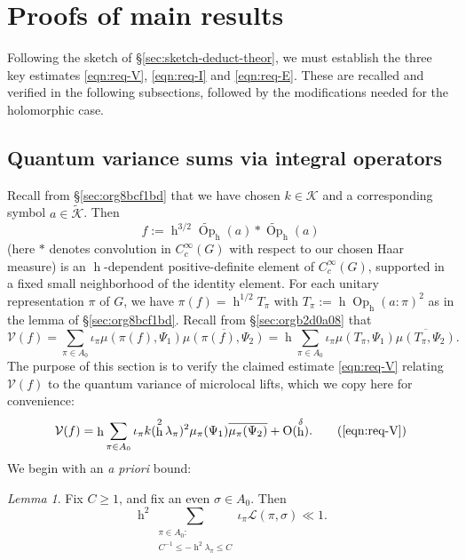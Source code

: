 \documentclass[reqno,10pt]{amsart}
\theoremstyle{plain} %
\theoremstyle{definition}
\theoremstyle{plain} %
\theoremstyle{remark}
\theoremstyle{itplain} %
\newtheorem*{lemma*}{Lemma}
\theoremstyle{remark} %
\renewcommand{\geq}{\geqslant}
\renewcommand{\leq}{\leqslant}
\numberwithin{equation}{section}
\def\O{\operatorname{O}}
\DeclareMathOperator{\Opp}{Op}
\DeclareMathOperator{\h}{h}
\begin{document}
    







\section{Proofs of main results}\label{sec:35ac3e57a1}
Following the sketch of \S\ref{sec:sketch-deduct-theor}, we must establish the three key estimates \eqref{eqn:req-V}, \eqref{eqn:req-I} and \eqref{eqn:req-E}.  These are recalled and verified in the following subsections, followed by the modifications needed for the holomorphic case.

\subsection{Quantum variance
  sums via integral operators}\label{sec:defn-f}
Recall from \S\ref{sec:org8bcf1bd} that we have chosen $k \in \mathcal{K}$ and a corresponding symbol $a \in \tilde{\mathcal{K}}$.  Then
\[
  f := \h^{3/2} \widetilde{\Opp}_{\h}(a) \ast \widetilde{\Opp}_{\h}(a)
\]
(here $\ast$ denotes convolution in $C_c^\infty(G)$ with respect to our chosen Haar measure) is an $\h$-dependent positive-definite element of $C_c^\infty(G)$, supported in a fixed small neighborhood of the identity element.  For each unitary representation $\pi$ of $G$, we have $\pi(f) = \h^{1/2} T_\pi$ with $T_\pi := \h \Opp_{\h}(a:\pi)^2$ as in the lemma of \S\ref{sec:org8bcf1bd}.  Recall from \S\ref{sec:orgb2d0a08} that
\begin{equation}\label{eq:recap-defn-cal-V}
  \mathcal{V}(f)
  =
  \sum_{\pi \in A_0}
  \iota_{\pi}
  \mu(\pi(f),\Psi_1)
  \overline{\mu(\pi(f),\Psi_2)}
  =
  \h \sum_{\pi \in A_0} \iota_\pi \mu(T_\pi,
  \Psi_1) \overline{ \mu(T_\pi, \Psi_2) }.
\end{equation}
The purpose of this section is to verify the claimed estimate \eqref{eqn:req-V} relating $\mathcal{V}(f)$ to the quantum variance of microlocal lifts, which we copy here for convenience:
\begin{equation}
  \mathcal{V}(f)
  = \h \sum_{\pi \in A_0}
  \iota_{\pi} k(\h^2 \lambda_\pi)^2
  \mu_\pi(\Psi_1)
  \overline{\mu_\pi(\Psi_2)}
  + \O(\h^\delta).
  \tag{\ref{eqn:req-V}}
\end{equation}
We begin with an \emph{a priori} bound:
\begin{lemma*}
  Fix $C \geq 1$, and fix an even $\sigma \in A_0$.  Then
  \begin{equation}\label{eq:SZ-upper-bound-2}
    \h^2
    \sum_{
      \substack{
        \pi \in A_0 : \\
        C^{-1} \leq - \h^2 \lambda_\pi \leq C
      }
    } \iota_{\pi}
    \mathcal{L}(\pi,\sigma)
    \ll 1.
  \end{equation}
\end{lemma*}
\end{document}
